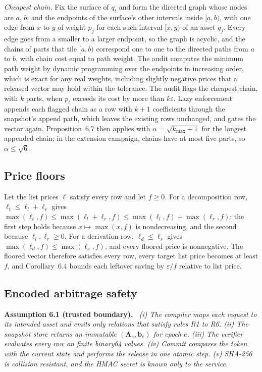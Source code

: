 \documentclass[10pt]{article}
\newcommand{\tol}{\varepsilon}
\newcommand{\Amat}{\mathbf{A}}
\newcommand{\bvec}{\mathbf{b}}
\newenvironment{paperstatement}[1]{\par\medskip\noindent\textbf{#1.}\itshape\ }{\par\medskip}
\begin{document}
\emph{Cheapest chain.} Fix the surface of $q_t$ and form the directed graph whose nodes are $a$, $b$, and the endpoints of the surface's other intervals inside $[a, b)$, with one edge from $x$ to $y$ of weight $p_j$ for each such interval $[x, y)$ of an asset $q_j$. Every edge goes from a smaller to a larger endpoint, so the graph is acyclic, and the chains of parts that tile $[a, b)$ correspond one to one to the directed paths from $a$ to $b$, with chain cost equal to path weight. The audit computes the minimum path weight by dynamic programming over the endpoints in increasing order, which is exact for any real weights, including slightly negative prices that a released vector may hold within the tolerance. The audit flags the cheapest chain, with $k$ parts, when $p_t$ exceeds its cost by more than $k\tol$. Lazy enforcement appends each flagged chain as a row with $k + 1$ coefficients through the snapshot's append path, which leaves the existing rows unchanged, and gates the vector again. Proposition~6.7 then applies with $\alpha = \sqrt{k_{\max} + 1}$ for the longest appended chain; in the extension campaign, chains have at most five parts, so $\alpha \le \sqrt{6}$.

\subsection{Price floors}
Let the list prices $\ell$ satisfy every row and let $f \ge 0$. For a decomposition row, $\ell_t \le \ell_l + \ell_r$ gives $\max(\ell_t, f) \le \max(\ell_l + \ell_r, f) \le \max(\ell_l, f) + \max(\ell_r, f)$: the first step holds because $x \mapsto \max(x, f)$ is nondecreasing, and the second because $\ell_l, \ell_r \ge 0$. For a derivation row, $\ell_d \le \ell_s$ gives $\max(\ell_d, f) \le \max(\ell_s, f)$, and every floored price is nonnegative. The floored vector therefore satisfies every row, every target list price becomes at least $f$, and Corollary~6.4 bounds each leftover saving by $\tol / f$ relative to list price.

\subsection{Encoded arbitrage safety}

\begin{paperstatement}{Assumption 6.1 (trusted boundary)}
(i) The compiler maps each request to its intended asset and emits only relations that satisfy rules R1 to R6. (ii) The snapshot store returns an immutable $(\Amat_e,\bvec_e)$ for epoch $e$. (iii) The verifier evaluates every row on finite binary64 values. (iv) Commit compares the token with the current state and performs the release in one atomic step. (v) SHA-256 is collision resistant, and the HMAC secret is known only to the service.
\end{paperstatement}
\end{document}
